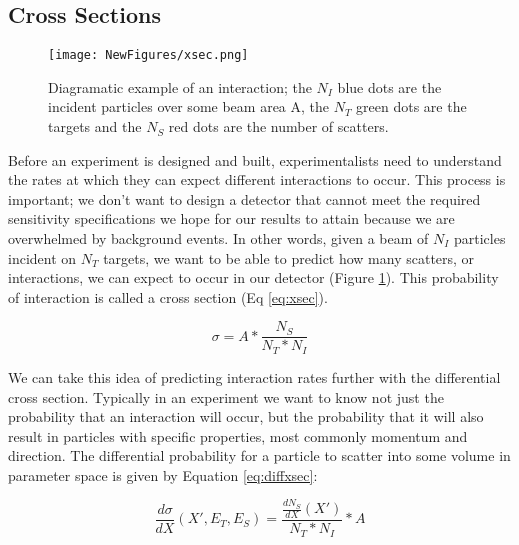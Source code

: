 \documentclass[12pt]{article}
\begin{document}
\subsection{Cross Sections}
\begin{figure}[H]
\centering
\texttt{[image: NewFigures/xsec.png]}
\caption{ Diagramatic example of an interaction; the $N_I$ blue dots are the incident particles over some beam area A, the $N_T$ green dots are the targets and the $N_S$ red dots are the number of scatters.}  
\label{fig:Xsec}
\end{figure}

Before an experiment is designed and built, experimentalists need to understand the rates at which they can expect different interactions to occur. This process is important; we don't want to design a detector that cannot meet the required sensitivity specifications we hope for our results to attain because we are overwhelmed by background events. In other words, given a beam of $N_I$ particles incident on $N_T$ targets, we want to be able to predict how many scatters, or interactions, we can expect to occur in our detector (Figure \ref{fig:Xsec}). This probability of interaction is called a cross section (Eq \ref{eq:xsec}). 

\begin{equation}
\sigma = A * \frac{N_S}{N_T * N_I}
\label{eq:xsec}
\end{equation}



\par We can take this idea of predicting interaction rates further with the differential cross section.  Typically in an experiment we want to know not just the probability that an interaction will occur, but the probability that it will also result in particles with specific properties, most commonly momentum and direction. The differential probability for a particle to scatter into some volume in parameter space is given by Equation \ref{eq:diffxsec}:

\begin{equation}
\frac{d\sigma}{dX}(X',E_T,E_S) = \frac{\frac{dN_S}{dX}(X')}{N_T*N_I} * A 
\label{eq:diffxsec}
\end{equation}
\end{document}

